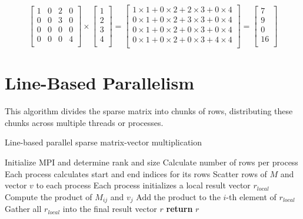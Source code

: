 \documentclass[12pt,oneside]{book} %
\begin{document}
\[
    \begin{bmatrix}
        1 & 0 & 2 & 0 \\
        0 & 0 & 3 & 0 \\
        0 & 0 & 0 & 0 \\
        0 & 0 & 0 & 4 \\
    \end{bmatrix}
    \times
    \begin{bmatrix}
        1 \\
        2 \\
        3 \\
        4 \\
    \end{bmatrix}
    =
    \begin{bmatrix}
        1 \times 1 + 0 \times 2 + 2 \times 3 + 0 \times 4 \\
        0 \times 1 + 0 \times 2 + 3 \times 3 + 0 \times 4 \\
        0 \times 1 + 0 \times 2 + 0 \times 3 + 0 \times 4 \\
        0 \times 1 + 0 \times 2 + 0 \times 3 + 4 \times 4 \\
    \end{bmatrix}
    =
    \begin{bmatrix}
        7  \\
        9  \\
        0  \\
        16 \\
    \end{bmatrix}
\]

\section{Line-Based Parallelism}
This algorithm divides the sparse matrix into chunks of rows, distributing
these chunks across multiple threads or processes.

\begin{algorithm}[H]
    \caption{Line-based parallel sparse matrix-vector multiplication}
    \begin{algorithmic}[1]
        \State Initialize MPI and determine rank and size
        \State Calculate number of rows per process
        \State Each process calculates start and end indices for its rows
        \State Scatter rows of $M$ and vector $v$ to each process
        \State Each process initializes a local result vector $r_{local}$
        \State Compute the product of $M_{ij}$ and $v_j$
        \State Add the product to the $i$-th element of $r_{local}$
        \EndFor
        \EndFor
        \State Gather all $r_{local}$ into the final result vector $r$
        \State \textbf{return} $r$
        \EndProcedure
    \end{algorithmic}
\end{algorithm}
\end{document}
